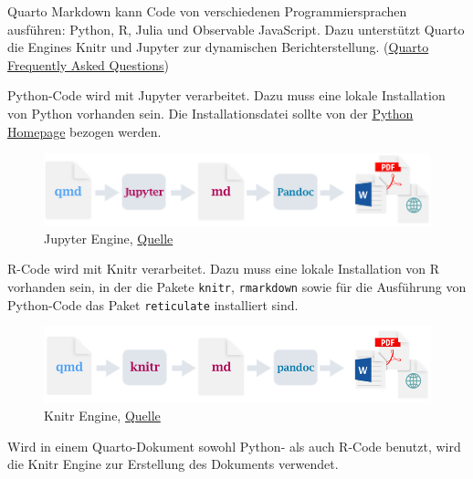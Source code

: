 \documentclass[
  letterpaper,
  DIV=11]{scrartcl}
\begin{document}
Quarto Markdown kann Code von verschiedenen Programmiersprachen
ausführen: Python, R, Julia und Observable JavaScript. Dazu unterstützt
Quarto die Engines Knitr und Jupyter zur dynamischen Berichterstellung.
(\href{https://quarto.org/docs/faq/\#what-programming-languages-are-supported-in-quarto}{Quarto
Frequently Asked Questions})

Python-Code wird mit Jupyter verarbeitet. Dazu muss eine lokale
Installation von Python vorhanden sein. Die Installationsdatei sollte
von der \href{https://www.python.org/downloads/}{Python Homepage}
bezogen werden.

\begin{figure}[H]

{\centering \includegraphics{skript/00-bilder/Renderpfad_Jupyter.png}

}

\caption{Jupyter Engine,
\href{https://quarto.org/docs/get-started/hello/vscode.html\#how-it-works}{Quelle}}

\end{figure}%

R-Code wird mit Knitr verarbeitet. Dazu muss eine lokale Installation
von R vorhanden sein, in der die Pakete \texttt{knitr},
\texttt{rmarkdown} sowie für die Ausführung von Python-Code das Paket
\texttt{reticulate} installiert sind.

\begin{figure}[H]

{\centering \includegraphics{skript/00-bilder/Renderpfad_Knitr.png}

}

\caption{Knitr Engine,
\href{https://quarto.org/docs/get-started/hello/rstudio.html\#how-it-works}{Quelle}}

\end{figure}%

Wird in einem Quarto-Dokument sowohl Python- als auch R-Code benutzt,
wird die Knitr Engine zur Erstellung des Dokuments verwendet.
\end{document}
